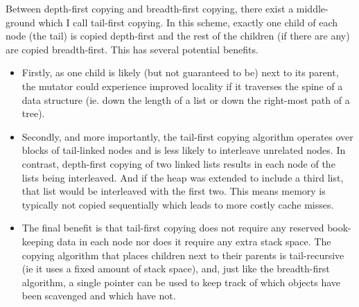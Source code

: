 \documentclass[a4paper,oneside]{memoir}
\begin{document}
Between depth-first copying and breadth-first copying, there exist a middle-ground
which I call tail-first copying. In this scheme, exactly one child of each node
(the tail) is copied depth-first and the rest of the children (if there are any)
are copied breadth-first. This has several potential benefits.
\begin{itemize}
  \item
  Firstly, as one
  child is likely (but not guaranteed to be) next to its parent, the mutator could
  experience improved locality if it traverses the spine of a data structure (ie.
  down the length of a list or down the right-most path of a tree).
  \item
  Secondly, and
  more importantly, the tail-first copying algorithm operates over blocks of
  tail-linked nodes and is less likely to interleave unrelated nodes. In contrast,
  depth-first copying of two linked lists results in each node of the lists being
  interleaved. And if the heap was extended to include a third list, that list
  would be interleaved with the first two. This means memory is typically not
  copied sequentially which leads to more costly cache misses.
  \item
  The final benefit
  is that tail-first copying does not require any reserved book-keeping data in
  each node nor does it require any extra stack space. The copying algorithm that
  places children next to their parents is tail-recursive (ie it uses a fixed
  amount of stack space), and, just like the breadth-first algorithm, a single
  pointer can be used to keep track of which objects have been scavenged and which
  have not.
\end{itemize}
\end{document}
